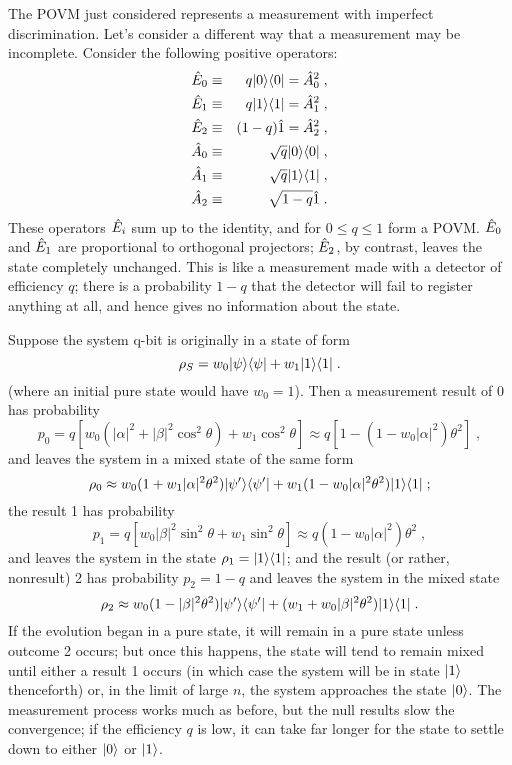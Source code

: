 The POVM just considered represents a measurement with imperfect
discrimination.  Let's consider a different way that a measurement may
be incomplete.  Consider the following positive operators:
\begin{eqnarray}
{\hat E}_0 &\equiv& q {| 0 \rangle}{\langle 0 |} = {\hat A}_0^2 \;, \nonumber\\
{\hat E}_1 &\equiv& q {| 1 \rangle}{\langle 1 |} = {\hat A}_1^2 \;, \nonumber\\
{\hat E}_2 &\equiv& (1-q) {\hat 1} = {\hat A}_2^2 \;, \nonumber\\
{\hat A}_0 &\equiv& \sqrt{q} {| 0 \rangle}{\langle 0 |} \;, \nonumber\\
{\hat A}_1 &\equiv& \sqrt{q} {| 1 \rangle}{\langle 1 |} \;, \nonumber\\
{\hat A}_2 &\equiv& \sqrt{1-q} {\hat 1} \;.
\end{eqnarray}
These operators ${\hat E}_i$ sum up to the identity, and for $0\le q\le1$
form a POVM.  ${\hat E}_0$ and ${\hat E}_1$ are
proportional to orthogonal projectors; ${\hat E}_2$, by contrast,
leaves the state completely unchanged.  This is like a measurement made
with a detector of efficiency $q$; there is a probability $1-q$ that
the detector will fail to register anything at all, and hence gives
no information about the state.

Suppose the system q-bit is originally in a state of form
\begin{equation}
\rho_S = w_0 {| \psi \rangle}{\langle \psi |} + w_1 {| 1 \rangle}{\langle 1 |} \;.
\label{rho_sys}
\end{equation}
(where an initial pure state would have $w_0=1$).  Then a measurement result
of 0 has probability
\begin{equation}
p_0 = q \left[ w_0(|\alpha|^2+|\beta|^2\cos^2\theta)
  + w_1\cos^2\theta \right] \approx q[1 - (1-w_0|\alpha|^2)\theta^2] \;,
\end{equation}
and leaves the system in a mixed state of the same form
\begin{equation}
\rho_0 \approx w_0(1+w_1|\alpha|^2\theta^2){| \psi' \rangle}{\langle \psi' |}
  + w_1(1-w_0|\alpha|^2\theta^2) {| 1 \rangle}{\langle 1 |} \;;
\end{equation}
the result 1 has probability
\begin{equation}
p_1 = q \left[ w_0|\beta|^2\sin^2\theta + w_1\sin^2\theta \right]
  \approx q (1-w_0|\alpha|^2)\theta^2 \;,
\end{equation}
and leaves the system in the state $\rho_1 = {| 1 \rangle}{\langle 1 |}$; and the result
(or rather, nonresult) 2 has probability $p_2 = 1-q$ and leaves the
system in the mixed state
\begin{equation}
\rho_2 \approx w_0(1-|\beta|^2\theta^2){| \psi' \rangle}{\langle \psi' |}
  + (w_1 + w_0|\beta|^2\theta^2){| 1 \rangle}{\langle 1 |} \;.
\end{equation}
If the evolution began in a pure state, it will remain in a pure state
unless outcome 2 occurs; but once this happens, the state will tend to
remain mixed until either a result 1 occurs (in which case the system
will be in state ${| 1 \rangle}$ thenceforth) or, in the limit of large $n$,
the system approaches the state ${| 0 \rangle}$.  The measurement process works
much as before, but the null results slow the convergence; if the efficiency
$q$ is low, it can take far longer for the state to settle down to
either ${| 0 \rangle}$ or ${| 1 \rangle}$.


